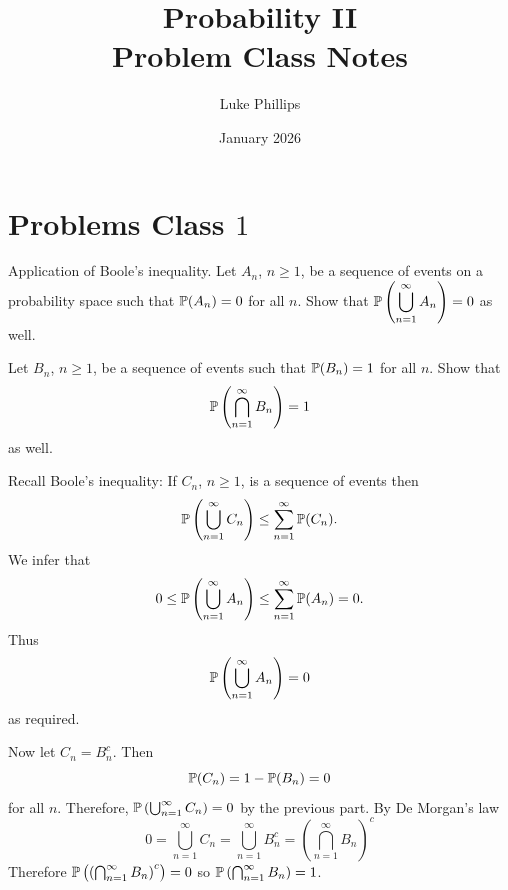 \documentclass[10pt, a4paper]{article}
\title{Probability II \\
    \large Problem Class Notes}
\author{Luke Phillips}
\date{January 2026}
\begin{document}
\maketitle

\newpage

\tableofcontents

\newpage

\section{Problems Class \texorpdfstring{$1$}{}}

\begin{problem}
    Application of Boole's inequality.
    Let $A_n$,
    $n \geq 1$,
    be a sequence of events on a probability space such that $\P(A_n) = 0$ for all $n$.
    Show that $\displaystyle\P\left(\bigcup_{n = 1}^{\infty}A_n\right) = 0$ as well.

    Let $B_n$,
    $n \geq 1$,
    be a sequence of events such that $\P(B_n) = 1$ for all $n$.
    Show that
    \[
    \P\left(\bigcap_{n = 1}^{\infty}B_n\right) = 1
    \]
    as well.

    \begin{solution}
        Recall Boole's inequality:
        If $C_n$,
        $n \geq 1$,
        is a sequence of events then
        \[
        \P\left(\bigcup_{n = 1}^{\infty}C_n\right) \leq \sum_{n = 1}^{\infty}\P(C_n).
        \]
        We infer that
        \[
        0 \leq \P\left(\bigcup_{n = 1}^{\infty}A_n\right) \leq \sum_{n = 1}^{\infty}\P(A_n) = 0.
        \]
        Thus
        \[
        \P\left(\bigcup_{n = 1}^{\infty}A_n\right) = 0
        \]
        as required.

        Now let $C_n = B_n ^ c$.
        Then
        \[
        \P(C_n) = 1 - \P(B_n) = 0
        \]
        for all $n$.
        Therefore,
        $\P\left(\bigcup_{n = 1}^{\infty}C_n\right) = 0$ by the previous part.
        By De Morgan's law
        \[
        0 = \bigcup_{n = 1}^{\infty}C_n = \bigcup_{n = 1}^{\infty}B_n ^ c = \left(\bigcap_{n = 1}^{\infty}B_n\right) ^ c
        \]
        Therefore $\P\left(\left(\bigcap_{n = 1}^{\infty}B_n\right) ^ c\right) = 0$ so $\P\left(\bigcap_{n = 1}^{\infty}B_n\right) = 1$.
    \end{solution}
\end{problem}
\end{document}
